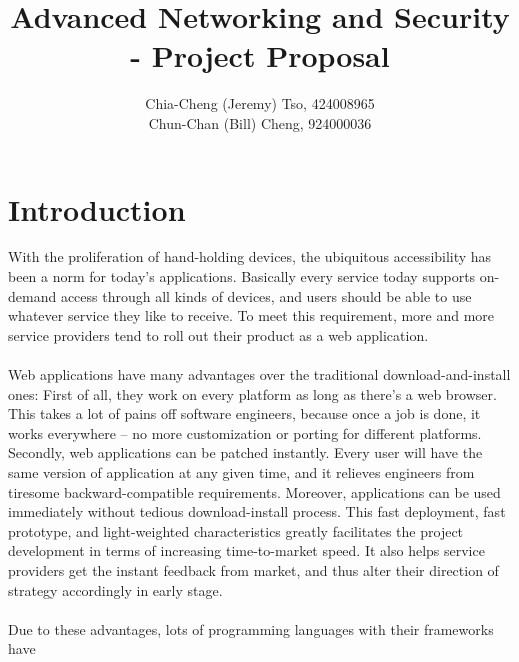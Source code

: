 \documentclass[12pt, a4paper]{article}
\title{
    Advanced Networking and Security\\
    - Project Proposal
    \vspace{-2ex}
}
\author{
    \normalfont \normalsize 
    Chia-Cheng (Jeremy) Tso, 
    424008965\\
    \normalfont \normalsize 
    Chun-Chan (Bill) Cheng, 
    924000036
}
\date{
    \normalfont \normalsize 
    \vspace{-5ex}
}
\begin{document}
\maketitle
%

\section{Introduction}
With the proliferation of hand-holding devices,
the ubiquitous accessibility has been a norm for today's applications.
Basically every service today supports on-demand access through all kinds of devices,
and users should be able to use whatever service they like to receive.
To meet this requirement, more and more service providers tend to roll
out their product as a
web application.
\\\\
Web applications have many advantages over the traditional download-and-install ones:
First of all, they work on every platform as long as there's a web browser.
This takes a lot of pains off software engineers, because once a job is done, it works everywhere
-- no more customization or porting for different platforms.
Secondly, web applications can be patched instantly.
Every user will have the same version of application at any given time,
and it relieves engineers from
tiresome backward-compatible requirements.
Moreover,
applications can be used immediately without tedious download-install process.
This fast deployment, fast prototype, and light-weighted characteristics
greatly facilitates the project development in terms of
increasing time-to-market speed.
It also helps service providers get the instant
feedback from market, and thus alter their direction of strategy accordingly in early stage.
\\\\
Due to these advantages, lots of programming languages with their frameworks have
\end{document}
